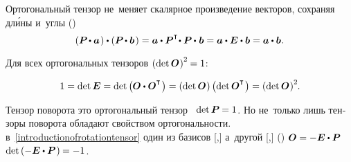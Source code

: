 \begin{otherlanguage}{russian}

Ортогональный тензор не~меняет скалярное произведение векторов, сохраняя дл\'{и}ны и~углы ()
\vspace{0.1em}\begin{equation}\label{rotationtensorkeepsmetrics}
\left( \bm{P} \hspace{-0.2ex} \dotp \bm{a}\hspace{0.2ex} \right) \dotp \left( \bm{P} \hspace{-0.2ex} \dotp \bm{b}\hspace{0.2ex} \right) =
\bm{a} \dotp \bm{P}^{\T} \hspace{-0.4ex} \dotp \bm{P} \hspace{-0.1ex} \dotp \hspace{0.1ex} \bm{b} = \bm{a} \dotp \bm{E} \dotp \bm{b} = \bm{a} \dotp \bm{b}
\hspace{0.1ex}.
\end{equation}

Для всех ортогональных тензоров ${\left(\operatorname{det} \bm{O}\hspace{.1ex}\right)^2 \hspace{-0.1ex} = 1}$:

\nopagebreak\vspace{-0.1em}\begin{equation*}
1 = \operatorname{det} \bm{E} = \operatorname{det} \left({\hspace{-0.1ex} \rotationtensor \dotp \rotationtensor^{\T} \hspace{.2ex}}\right) =
\left({\operatorname{det} \rotationtensor \hspace{.1ex}}\right) \left({\operatorname{det} \rotationtensor^{\T} \hspace{.2ex}}\right) =
\left(\operatorname{det} \rotationtensor \hspace{.1ex} \right)^2
\hspace{-0.1ex} \!.
\end{equation*}

Тензор поворота это ортогональный тензор ~${\operatorname{det} \bm{P} \hspace{-0.1ex} = 1}$.
Но не~только лишь тензоры поворота обладают свойством ортогональности.
 в~\eqref{introductionofrotationtensor} один из базисов [,] а~другой [,]   () ${\rotationtensor = -\bm{E} \dotp \bm{P}}$ ~${\operatorname{det} \left( -\bm{E} \dotp \bm{P} \hspace{0.16ex} \right) \hspace{-0.1ex} = -1}$.


\end{otherlanguage}
